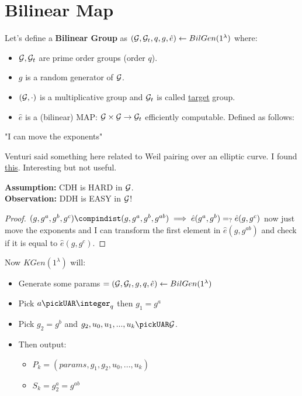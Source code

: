 \section{Bilinear Map}
Let's define a \textbf{Bilinear Group} as $(\mathcal{G}, \mathcal{G}_t, q, g, \hat{e})\leftarrow BilGen(1^{\lambda})$ where:
\begin{itemize}
    \item $\mathcal{G}, \mathcal{G}_t$ are prime order groups (order $q$).
    \item $g$ is a random generator of $\mathcal{G}$.
    \item $(\mathcal{G}, \cdot)$ is a multiplicative group and $\mathcal{G}_t$ is called \underline{target} group.
    \item $\hat{e}$ is a (bilinear) MAP: $\mathcal{G} \times \mathcal{G} \rightarrow \mathcal{G}_t$ efficiently computable. Defined as follows:
    
\end{itemize}
"I can move the exponents"

Venturi said something here related to Weil pairing over an elliptic curve. I found \href{https://www.math.auckland.ac.nz/~sgal018/crypto-book/ch26.pdf}{this}. Interesting but not useful.
 
\noindent\textbf{Assumption:} CDH is HARD in $\mathcal{G}$.\\
\textbf{Observation:} DDH is EASY in $\mathcal{G}$!
\begin{proof}
    $(g,g^a,g^b,g^c)\compindist (g,g^a,g^b,g^{ab}) \implies \hat{e}(g^a,g^b)=_?\hat{e}(g,g^c)$ now just move the exponents and I can transform the first element in $\hat{e}(g,g^{ab})$ and check if it is equal to $\hat{e}(g,g^c)$.
\end{proof}

Now $KGen(1^{\lambda})$ will:
\begin{itemize}
    \item Generate some params $ =(\mathcal{G},\mathcal{G}_t,g,q,\hat{e})\leftarrow BilGen(1^{\lambda})$ 
    \item Pick $a \pickUAR \integer_q$ then $g_1=g^a$
    \item Pick $g_2=g^b$ and $g_2,u_0,u_1,...,u_k \pickUAR \G$.
    \item Then output: 
    \begin{itemize}
        \item $P_k=(params, g_1,g_2,u_0,...,u_k)$
        \item $S_k=g_2^a=g^{ab}$
    \end{itemize}
\end{itemize}

